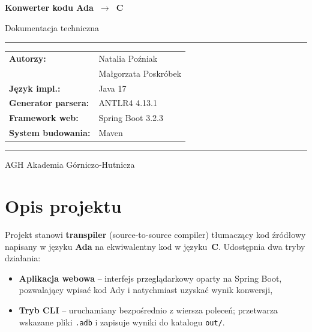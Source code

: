\documentclass[12pt,a4paper]{article}
\begin{document}
\begin{titlepage}
  \centering
  \vspace*{2cm}
  {\Huge\bfseries Konwerter kodu Ada~$\rightarrow$~C\par}
  \vspace{0.5cm}
  {\Large Dokumentacja techniczna\par}
  \vspace{1.5cm}
  \rule{\linewidth}{0.4pt}
  \vspace{1cm}

  \begin{tabular}{ll}
    \textbf{Autorzy:}   & Natalia Poźniak \\
                        & Małgorzata Poskróbek \\[6pt]
    \textbf{Język impl.:} & Java 17 \\
    \textbf{Generator parsera:} & ANTLR4 4.13.1 \\
    \textbf{Framework web:} & Spring Boot 3.2.3 \\
    \textbf{System budowania:} & Maven \\
  \end{tabular}

  \vspace{1cm}
  \rule{\linewidth}{0.4pt}
  \vfill
  {\large AGH Akademia Górniczo-Hutnicza\par}
  {\large \the\year\par}
\end{titlepage}

\tableofcontents
\newpage

\section{Opis projektu}

Projekt stanowi \textbf{transpiler} (source-to-source compiler) tłumaczący kod źródłowy
napisany w języku \textbf{Ada} na ekwiwalentny kod w języku~\textbf{C}.
Udostępnia dwa tryby działania:

\begin{itemize}
  \item \textbf{Aplikacja webowa} -- interfejs przeglądarkowy oparty na Spring Boot,
        pozwalający wpisać kod Ady i natychmiast uzyskać wynik konwersji,
  \item \textbf{Tryb CLI} -- uruchamiany bezpośrednio z wiersza poleceń;
        przetwarza wskazane pliki \texttt{.adb} i zapisuje wyniki do katalogu \texttt{out/}.
\end{itemize}
\end{document}
